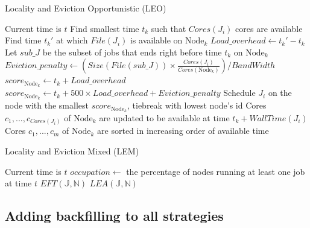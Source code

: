 \documentclass[conference,10pt]{IEEEtran}
\newcommand{\Node}[1]{\ensuremath{\mathrm{Node}_{#1}}\xspace}
\newcommand{\file}{\ensuremath{\mathit{File}}\xspace}
\newcommand{\size}{\ensuremath{\mathit{Size}}\xspace}
\newcommand{\bandwidth}{\mathit{BandWidth}\xspace}
\newcommand{\core}{\mathit{Cores}\xspace}
\newcommand{\walltime}{\mathit{WallTime}\xspace}
\newcommand{\jobset}{\ensuremath{\mathbb{J}}\xspace}
\newcommand{\nodeset}{\ensuremath{\mathbb{N}}\xspace}
\begin{document}
\begin{algorithm*}[htb]%
\caption{Locality and Eviction Opportunistic (LEO)}\label{algo.leo}
\begin{algorithmic}[1]
	\Statex Current time is $t$
		\ForEach{$\Node{k} \in \nodeset$}
			\State Find smallest time $t_k$ such that $\core(J_i)$ cores are available
			\State Find time $t_k'$ at which $\file(J_i)$ is available on $\Node{k}$
			\State $Load\_overhead \gets t_k' - t_k$
			\State Let $\mathit{sub\_J}$ be the subset of jobs that ends right before time $t_k$ on $\Node{k}$
			\State $Eviction\_penalty \gets (\size(\file(\mathit{sub\_J})) \times \frac{\core(J_i)}{\core(\Node{k})})/\bandwidth$
				\State $score_{\Node{k}} \gets t_k + Load\_overhead$
			\Else
				\State $score_{\Node{k}} \gets t_k + 500 \times Load\_overhead + Eviction\_penalty$
			\EndIf
		\EndFor
		\State Schedule $J_i$ on the node with the smallest $score_{\Node{k}}$, tiebreak with lowest node's id
		\State Cores $c_1, ..., c_{\core(J_i)}$ of $\Node{k}$ are updated to be available at time $t_k + \walltime(J_i)$
		\State Cores $c_1, ..., c_m$ of $\Node{k}$ are sorted in increasing order of available time
	\EndFor
\end{algorithmic}
\end{algorithm*}


\begin{algorithm*}[htb]%
\caption{Locality and Eviction Mixed (LEM)}\label{algo.lem}
\begin{algorithmic}[1]
	\Statex Current time is $t$
		\State $occupation \gets$ the percentage of nodes running at least one job at time $t$
			\State $EFT(\jobset,\nodeset)$
		\Else
			\State $LEA(\jobset,\nodeset)$
		\EndIf
	\EndFor
\end{algorithmic}
\end{algorithm*}

\subsection{Adding backfilling to all strategies}
\end{document}
